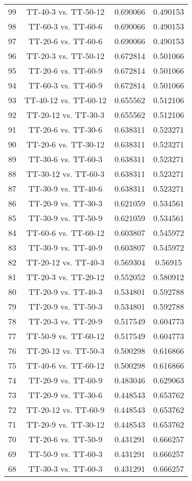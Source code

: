 \documentclass[a4paper,10pt]{article}
\begin{document}
\begin{landscape}
\begin{table}[!htp]
\begin{tabular}{cccc}
99&TT-40-3 vs. TT-50-12&0.690066&0.490153\\
98&TT-60-3 vs. TT-60-6&0.690066&0.490153\\
97&TT-20-6 vs. TT-60-6&0.690066&0.490153\\
96&TT-20-3 vs. TT-50-12&0.672814&0.501066\\
95&TT-20-6 vs. TT-60-9&0.672814&0.501066\\
94&TT-60-3 vs. TT-60-9&0.672814&0.501066\\
93&TT-40-12 vs. TT-60-12&0.655562&0.512106\\
92&TT-20-12 vs. TT-30-3&0.655562&0.512106\\
91&TT-20-6 vs. TT-30-6&0.638311&0.523271\\
90&TT-20-6 vs. TT-30-12&0.638311&0.523271\\
89&TT-30-6 vs. TT-60-3&0.638311&0.523271\\
88&TT-30-12 vs. TT-60-3&0.638311&0.523271\\
87&TT-30-9 vs. TT-40-6&0.638311&0.523271\\
86&TT-20-9 vs. TT-30-3&0.621059&0.534561\\
85&TT-30-9 vs. TT-50-9&0.621059&0.534561\\
84&TT-60-6 vs. TT-60-12&0.603807&0.545972\\
83&TT-30-9 vs. TT-40-9&0.603807&0.545972\\
82&TT-20-12 vs. TT-40-3&0.569304&0.56915\\
81&TT-20-3 vs. TT-20-12&0.552052&0.580912\\
80&TT-20-9 vs. TT-40-3&0.534801&0.592788\\
79&TT-20-9 vs. TT-50-3&0.534801&0.592788\\
78&TT-20-3 vs. TT-20-9&0.517549&0.604773\\
77&TT-50-9 vs. TT-60-12&0.517549&0.604773\\
76&TT-20-12 vs. TT-50-3&0.500298&0.616866\\
75&TT-40-6 vs. TT-60-12&0.500298&0.616866\\
74&TT-20-9 vs. TT-60-9&0.483046&0.629063\\
73&TT-20-9 vs. TT-30-6&0.448543&0.653762\\
72&TT-20-12 vs. TT-60-9&0.448543&0.653762\\
71&TT-20-9 vs. TT-30-12&0.448543&0.653762\\
70&TT-20-6 vs. TT-50-9&0.431291&0.666257\\
69&TT-50-9 vs. TT-60-3&0.431291&0.666257\\
68&TT-30-3 vs. TT-60-3&0.431291&0.666257\\

\end{tabular}
\end{table}
\end{landscape}
\end{document}
